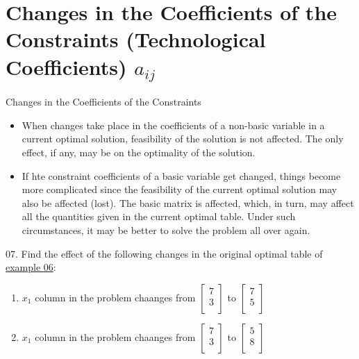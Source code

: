 
\section{Changes in the Coefficients of the Constraints (Technological Coefficients) $a_{ij}$}

\begin{frame}{Changes in the Coefficients of the Constraints}{}
  \begin{itemize} \justifying \parskip5mm
  \item When changes take place in the coefficients of a \alert{non-basic variable} in a current optimal solution, feasibility of the solution is not affected. The only effect, if any, may be on the optimality of the solution.
  \item If hte constraint coefficients of a \alert{basic variable} get changed, things become more complicated since the feasibility of the current optimal solution may also be affected (lost). \alert{The basic matrix is affected}, which, in turn, may affect all the quantities given in the current optimal table. Under such circumstances, \alert{it may be better to solve the problem all over again}.
  \end{itemize}
\end{frame}

\begin{frameExample}{07.}{}
  Find the effect of the following changes in the original optimal table of \hyperlink{example06}{example 06}:

  \begin{enumerate}[label=\alph*)] \justifying \parskip4mm
  \item $x_1$ column in the problem chaanges from %
    $
    \begin{bmatrix}
      7\\3\\
    \end{bmatrix}
    $ to %
    $
    \begin{bmatrix}
      7\\5\\
    \end{bmatrix}
    $
  \item $x_1$ column in the problem chaanges from %
    $
    \begin{bmatrix}
      7\\3\\
    \end{bmatrix}
    $ to %
    $
    \begin{bmatrix}
      5\\8\\
    \end{bmatrix}
    $
  \end{enumerate}
\end{frameExample}



